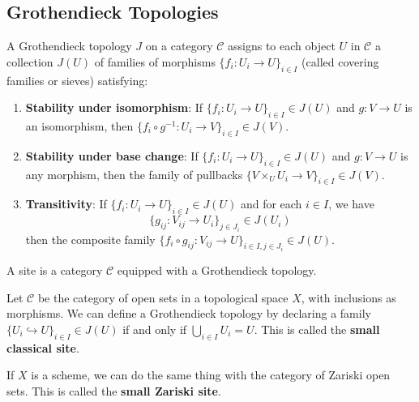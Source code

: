 \documentclass[12pt]{article}
\begin{document}
\subsection{Grothendieck Topologies}

\begin{definition}
    A Grothendieck topology $J$ on a category $\mathcal{C}$ assigns to each object $U$ in $\mathcal{C}$ a collection $J(U)$ of families of morphisms $\{f_i: U_i \to U\}_{i \in I}$ (called covering families or sieves) satisfying:

    \begin{enumerate}
        \item \textbf{Stability under isomorphism}: If $\{f_i: U_i \to U\}_{i \in I} \in J(U)$ and $g: V \to U$ is an isomorphism, then $\{f_i \circ g^{-1}: U_i \to V\}_{i \in I} \in J(V)$.

        \item \textbf{Stability under base change}: If $\{f_i: U_i \to U\}_{i \in I} \in J(U)$ and $g: V \to U$ is any morphism, then the family of pullbacks $\{V \times_U U_i \to V\}_{i \in I} \in J(V)$.

        \item \textbf{Transitivity}: If $\{f_i: U_i \to U\}_{i \in I} \in J(U)$ and for each $i \in I$, we have \[\{g_{ij}: V_{ij} \to U_i\}_{j \in J_i} \in J(U_i)\] then the composite family $\{f_i \circ g_{ij}: V_{ij} \to U\}_{i \in I, j \in J_i} \in J(U)$.
    \end{enumerate}
\end{definition}

\begin{definition}[Site]
    A site is a category $\mathcal{C}$ equipped with a Grothendieck topology.
\end{definition}
\begin{example}
    Let $\mathcal{C}$ be the category of open sets in a topological space $X$, with inclusions as morphisms. We can define a Grothendieck topology by declaring a family $\{U_i \hookrightarrow U\}_{i \in I} \in J(U)$ if and only if $\bigcup_{i \in I} U_i = U$. This is called the \textbf{small classical site}.

    If $X$ is a scheme, we can do the same thing with the category of Zariski open sets. This is called the \textbf{small Zariski site}.
\end{example}
\end{document}
